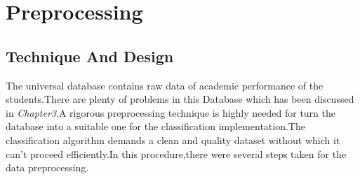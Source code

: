 \documentclass[a4paper,12pt]{book}
\begin{document}
\chapter{Preprocessing} %

\label{Preprocessing} %




\section{Technique And Design}
The universal database contains raw data of academic performance of the students.There are plenty of problems in this Database which has been discussed in \textit{Chapter3}.A rigorous preprocessing technique is highly needed for turn the database into a suitable one for the classification implementation.The classification algorithm demands a clean and quality dataset without which it can't proceed efficiently.In this procedure,there were several steps taken for the data preprocessing. 
\end{document}
